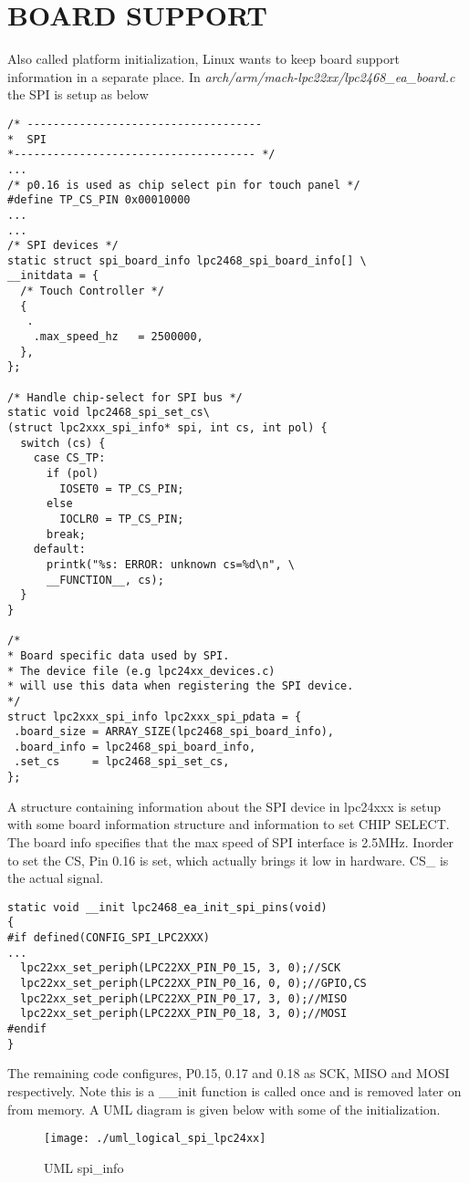 \documentclass{book}
\begin{document}
\section{BOARD SUPPORT}
Also called platform initialization, Linux wants to keep board support information in a separate place. In \textit{arch/arm/mach-lpc22xx/lpc2468\_ea\_board.c} the SPI is setup as below 
\begin{Verbatim}[fontsize=\footnotesize]
/* ------------------------------------  
*  SPI  
*------------------------------------- */
...
/* p0.16 is used as chip select pin for touch panel */ 
#define TP_CS_PIN 0x00010000 
...
...
/* SPI devices */ 
static struct spi_board_info lpc2468_spi_board_info[] \
__initdata = {
  /* Touch Controller */
  { 
   .
    .max_speed_hz   = 2500000,
  },
};

/* Handle chip-select for SPI bus */ 
static void lpc2468_spi_set_cs\
(struct lpc2xxx_spi_info* spi, int cs, int pol) {
  switch (cs) { 
    case CS_TP:
      if (pol) 
        IOSET0 = TP_CS_PIN; 
      else
        IOCLR0 = TP_CS_PIN;
      break;
    default:
      printk("%s: ERROR: unknown cs=%d\n", \
      __FUNCTION__, cs); 	
  } 
}

/*   
* Board specific data used by SPI. 
* The device file (e.g lpc24xx_devices.c)  
* will use this data when registering the SPI device.  
*/ 
struct lpc2xxx_spi_info lpc2xxx_spi_pdata = {
 .board_size = ARRAY_SIZE(lpc2468_spi_board_info),
 .board_info = lpc2468_spi_board_info,
 .set_cs     = lpc2468_spi_set_cs, 
};
\end{Verbatim}
A structure containing information about the SPI device in lpc24xxx is setup with some board information structure and information to set CHIP SELECT. The board info specifies that the max speed of SPI interface is 2.5MHz. Inorder to set the CS, Pin 0.16 is set, which actually brings it low in hardware. CS\_ is the actual signal.
\begin{Verbatim}[fontsize=\footnotesize]
static void __init lpc2468_ea_init_spi_pins(void) 
{ 
#if defined(CONFIG_SPI_LPC2XXX) 	
...
  lpc22xx_set_periph(LPC22XX_PIN_P0_15, 3, 0);//SCK
  lpc22xx_set_periph(LPC22XX_PIN_P0_16, 0, 0);//GPIO,CS
  lpc22xx_set_periph(LPC22XX_PIN_P0_17, 3, 0);//MISO
  lpc22xx_set_periph(LPC22XX_PIN_P0_18, 3, 0);//MOSI
#endif 
} 
\end{Verbatim}
The remaining code configures, P0.15, 0.17 and 0.18 as SCK, MISO and MOSI respectively. Note this is a \_\_init function is called once and is removed later on from memory. A UML diagram is given below with some of the initialization.\begin{figure}[h]
\centering
\texttt{[image: ./uml\_logical\_spi\_lpc24xx]}
\caption{UML spi\_info}
\label{fig:uml_logical_spi_lpc24xx}
\end{figure}
\end{document}

